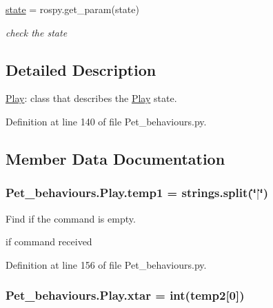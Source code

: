 \begin{DoxyCompactItemize}
\item 
\hyperlink{classPet__behaviours_1_1Play_ad1cd8e207b954e328020bc5026bff92e}{state} = rospy.\+get\+\_\+param(\textquotesingle{}state\textquotesingle{})\hypertarget{classPet__behaviours_1_1Play_ad1cd8e207b954e328020bc5026bff92e}{}\label{classPet__behaviours_1_1Play_ad1cd8e207b954e328020bc5026bff92e}

\begin{DoxyCompactList}\small\item\em check the state \end{DoxyCompactList}\end{DoxyCompactItemize}


\subsection{Detailed Description}
\hyperlink{classPet__behaviours_1_1Play}{Play}\+: class that describes the \hyperlink{classPet__behaviours_1_1Play}{Play} state. 

Definition at line 140 of file Pet\+\_\+behaviours.\+py.



\subsection{Member Data Documentation}
\subsubsection[{\texorpdfstring{temp1}{temp1}}]{\setlength{\rightskip}{0pt plus 5cm}Pet\+\_\+behaviours.\+Play.\+temp1 = strings.\+split(\char`\"{}$\vert$\char`\"{})\hspace{0.3cm}{\ttfamily [static]}}\hypertarget{classPet__behaviours_1_1Play_a0140f371bf2370c8f93925750383841f}{}\label{classPet__behaviours_1_1Play_a0140f371bf2370c8f93925750383841f}


Find if the command is empty. 

if command received 

Definition at line 156 of file Pet\+\_\+behaviours.\+py.

\subsubsection[{\texorpdfstring{xtar}{xtar}}]{\setlength{\rightskip}{0pt plus 5cm}Pet\+\_\+behaviours.\+Play.\+xtar = int({\bf temp2}\mbox{[}0\mbox{]})\hspace{0.3cm}{\ttfamily [static]}}\hypertarget{classPet__behaviours_1_1Play_aa7e0891e996e7d38e850cc388516b0c7}{}\label{classPet__behaviours_1_1Play_aa7e0891e996e7d38e850cc388516b0c7}


